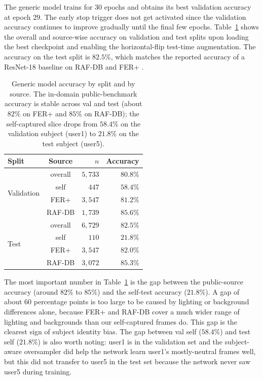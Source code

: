 \documentclass[12pt,a4paper]{article}
\begin{document}
The generic model trains for $30$ epochs and obtains
its best validation accuracy at epoch $29$. The early stop
trigger does not get activated since the validation accuracy
continues to improve gradually until the final few epochs.
Table~\ref{tab:overall} shows the overall and source-wise accuracy on validation
and test splits upon loading the best checkpoint and enabling
the horizontal-flip test-time augmentation. The accuracy on
the test split is $82.5\%$, which matches the reported accuracy of a
ResNet-18 baseline on RAF-DB and FER+ \autocite{wang2020ran}.
\begin{table}[H]
  \centering
  \footnotesize
  \begin{tabular}{lcrr}
    \toprule
    Split & Source & $n$ & Accuracy \\
    \midrule
    \multirow{4}{*}{Validation}
        & overall  & $5{,}733$ & $80.8\%$ \\
        & self     & $447$     & $58.4\%$ \\
        & FER+     & $3{,}547$ & $81.2\%$ \\
        & RAF-DB   & $1{,}739$ & $85.6\%$ \\
    \midrule
    \multirow{4}{*}{Test}
        & overall  & $6{,}729$ & $82.5\%$ \\
        & self     & $110$     & $21.8\%$ \\
        & FER+     & $3{,}547$ & $82.0\%$ \\
        & RAF-DB   & $3{,}072$ & $85.3\%$ \\
    \bottomrule
  \end{tabular}
  \caption{\footnotesize Generic model accuracy by split and by source. The
  in-domain public-benchmark accuracy is stable across val and
  test (about $82\%$ on FER+ and $85\%$ on RAF-DB); the
  self-captured slice drops from $58.4\%$ on the validation
  subject (user1) to $21.8\%$ on the test subject (user5).}
  \label{tab:overall}
\end{table}

The most important number in Table~\ref{tab:overall} is the
gap between the public-source accuracy (around $82\%$ to $85\%$)
and the self-test accuracy ($21.8\%$). A gap of about
$60$ percentage points is too large to be caused by lighting or
background differences alone, because FER+ and RAF-DB cover a
much wider range of lighting and backgrounds than our
self-captured frames do. This gap is the clearest sign of
subject identity bias. The gap between val self ($58.4\%$) and
test self ($21.8\%$) is also worth noting: user1 is in the
validation set and the subject-aware oversampler did help the
network learn user1's mostly-neutral frames well, but this did
not transfer to user5 in the test set because the network never
saw user5 during training.
\end{document}
